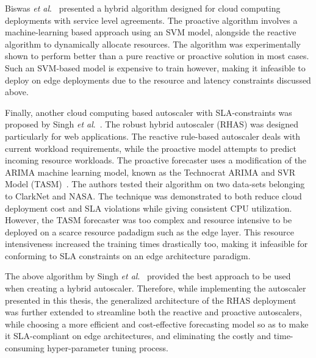 Biswas \textit{et al}.~\cite{biswas2017hybrid} presented a hybrid algorithm designed for cloud computing deployments with service level agreements. The proactive algorithm involves a machine-learning based approach using an SVM model, alongside the reactive algorithm to dynamically allocate resources. The algorithm was experimentally shown to perform better than a pure reactive or proactive solution in most cases. Such an SVM-based model is expensive to train however, making it infeasible to deploy on edge deployments due to the resource and latency constraints discussed above.\par

Finally, another cloud computing based autoscaler with SLA-constraints was proposed by Singh \textit{et al}.~\cite{singh2021rhas}. The robust hybrid autoscaler (RHAS) was designed particularly for web applications. The reactive rule-based autoscaler deals with current workload requirements, while the proactive model attempts to predict incoming resource workloads. The proactive forecaster uses a modification of the ARIMA machine learning model, known as the Technocrat ARIMA and SVR Model (TASM)~\cite{singh2019tasm}. The authors tested their algorithm on two data-sets belonging to ClarkNet and NASA. The technique was demonstrated to both reduce cloud deployment cost and SLA violations while giving consistent CPU utilization. However, the TASM forecaster was too complex and resource intensive to be deployed on a scarce resource padadigm such as the edge layer. This resource intensiveness increased the training times drastically too, making it infeasible for conforming to SLA constraints on an edge architecture paradigm.\par

The above algorithm by Singh \textit{et al}.~\cite{singh2021rhas} provided the best approach to be used when creating a hybrid autoscaler. Therefore, while implementing the autoscaler presented in this thesis, the generalized architecture of the RHAS deployment was further extended to streamline both the reactive and proactive autoscalers, while choosing a more efficient and cost-effective forecasting model so as to make it SLA-compliant on edge architectures, and eliminating the costly and time-consuming hyper-parameter tuning process.\par
